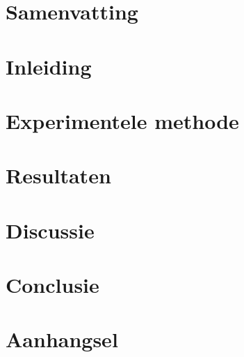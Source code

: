 \documentclass[oneside]{book}
\begin{document}
\title{}
\author{
name and studentnr here
R.S Sluis - 4088816}
\date{Delft, \today}

\frontmatter

\maketitle

\setcounter{page}{2}

\tableofcontents

\chapter{Samenvatting}

\mainmatter

\chapter{Inleiding}

\cite{greenwade93}

\chapter{Experimentele methode}

\chapter{Resultaten}

\chapter{Discussie}

\chapter{Conclusie}

\backmatter

{}




\appendix
\chapter{Aanhangsel}
\end{document}
